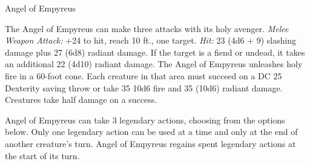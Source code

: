 \documentclass[10pt,a4paper,twoside,twocolumn,openany,bg=print,nodeprecatedcode]{dndbook}
\begin{document}
\begin{DndMonster}[float*=t]{Angel of Empyreus}
\par
{}
The Angel of Empyreus can make three attacks with its holy avenger.
\textsl{Melee Weapon Attack:} +24 to hit, reach 10 ft., one target. \textsl{Hit:} 23 (4d6 + 9) slashing damage plus 27 (6d8) radiant damage. If the target is a fiend or undead, it takes an additional 22 (4d10) radiant damage.
The Angel of Empyreus unleashes holy fire in a 60-foot cone. Each creature in that area must succeed on a DC 25 Dexterity saving throw or take 35 10d6 fire and 35 (10d6) radiant damage. Creatures take half damage on a success.
\par
{}
Angel of Empyreus can take 3 legendary actions, choosing from the options below. Only one legendary action can be used at a time and only at the end of another creature's turn. Angel of Empyreus regains spent legendary actions at the start of its turn.
\begin{DndMonsterLegendaryActions}
\end{DndMonsterLegendaryActions}
\end{DndMonster}
\end{document}
